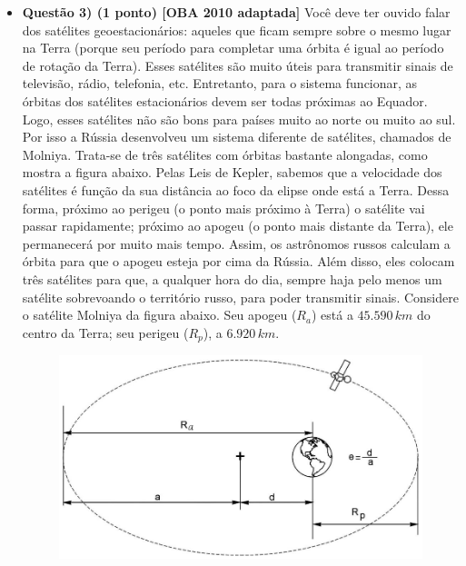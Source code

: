 \documentclass[a4paper, 12pt]{article}
\begin{document}
\begin{flushleft}
\begin{itemize}
            \item \textbf{Questão 3) (1 ponto) [OBA 2010 adaptada]} Você deve ter ouvido falar dos satélites geoestacionários: aqueles que ficam sempre sobre o mesmo lugar na Terra (porque seu período para completar uma órbita é igual ao período de rotação da Terra). Esses satélites são muito úteis para transmitir sinais de televisão, rádio, telefonia, etc. \linebreak \linebreak Entretanto, para o sistema funcionar, as órbitas dos satélites estacionários devem ser todas próximas ao Equador. Logo, esses satélites não são bons para países muito ao norte ou muito ao sul. Por isso a Rússia desenvolveu um sistema diferente de satélites, chamados de Molniya. Trata-se de três satélites com órbitas bastante alongadas, como mostra a figura abaixo. \linebreak \linebreak Pelas Leis de Kepler, sabemos que a velocidade dos satélites é função da sua distância ao foco da elipse onde está a Terra. Dessa forma, próximo ao perigeu (o ponto mais próximo à Terra) o satélite vai passar rapidamente; próximo ao apogeu (o ponto mais distante da Terra), ele permanecerá por muito mais tempo. Assim, os astrônomos russos calculam a órbita para que o apogeu esteja por cima da Rússia. Além disso, eles colocam três satélites para que, a qualquer hora do dia, sempre haja pelo menos um satélite sobrevoando o território russo, para poder transmitir sinais. \linebreak \linebreak Considere o satélite Molniya da figura abaixo. Seu apogeu ($R_a$) está a $45.590 \, km$ do centro da Terra; seu perigeu ($R_p$), a $6.920 \, km$.
                \begin{figure}[H]
                    \centering
                    \includegraphics[scale=0.5]{img/3.png}

\end{figure}
\end{itemize}
\end{flushleft}
\end{document}
